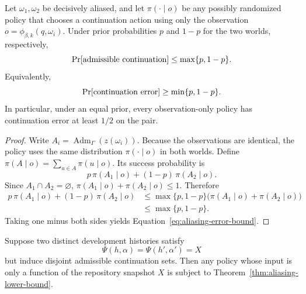 \begin{theorem}
\label{thm:aliasing-lower-bound}
Let $\omega_1,\omega_2$ be decisively aliased, and let
$\pi(\cdot\mid o)$ be any possibly randomized policy that chooses a continuation
action using only the observation
$o=\phi_{\beta,k}(q,\omega_i)$.  Under prior probabilities
$p$ and $1-p$ for the two worlds, respectively,
\begin{equation}
\Pr[\textnormal{admissible continuation}]
\le
\max\{p,1-p\}.
\label{eq:aliasing-success-bound}
\end{equation}
Equivalently,
\begin{equation}
\Pr[\textnormal{continuation error}]
\ge
\min\{p,1-p\}.
\label{eq:aliasing-error-bound}
\end{equation}
In particular, under an equal prior, every observation-only policy has
continuation error at least $1/2$ on the pair.
\end{theorem}

\begin{proof}
Write
$A_i=\operatorname{Adm}_\Gamma(z(\omega_i))$.
Because the observations are identical, the policy uses the same distribution
$\pi(\cdot\mid o)$ in both worlds.  Define
$\pi(A\mid o)=\sum_{u\in A}\pi(u\mid o)$.  Its success probability is
\begin{equation}
p\,\pi(A_1\mid o)
+
(1-p)\,\pi(A_2\mid o).
\end{equation}
Since $A_1\cap A_2=\varnothing$,
$\pi(A_1\mid o)+\pi(A_2\mid o)\le 1$.  Therefore
\begin{align}
p\,\pi(A_1\mid o)
+
(1-p)\,\pi(A_2\mid o)
&\le
\max\{p,1-p\}
\bigl(
\pi(A_1\mid o)+\pi(A_2\mid o)
\bigr)\\
&\le
\max\{p,1-p\}.
\end{align}
Taking one minus both sides yields
Equation~\eqref{eq:aliasing-error-bound}.
\end{proof}

\begin{corollary}
\label{cor:repository-nonidentifiability}
Suppose two distinct development histories satisfy
\begin{equation}
\Psi(h,\alpha)=\Psi(h',\alpha')=X
\end{equation}
but induce disjoint admissible continuation sets.  Then any policy whose input is
only a function of the repository snapshot $X$ is subject to
Theorem~\ref{thm:aliasing-lower-bound}.
\end{corollary}

